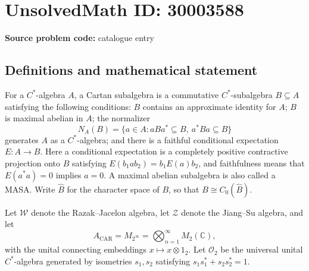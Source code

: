 \documentclass[11pt]{article}
\newcommand{\C}{\mathbb{C}}
\begin{document}
\section*{UnsolvedMath ID: 30003588}
\textbf{Source problem code:} catalogue entry
\subsection{Definitions and mathematical statement}
For a \(C^*\)-algebra \(A\), a Cartan subalgebra is a commutative \(C^*\)-subalgebra \(B\subseteq A\) satisfying the following conditions: \(B\) contains an approximate identity for \(A\); \(B\) is maximal abelian in \(A\); the normalizer
\[
N_A(B)=\{a\in A:aBa^*\subseteq B,\ a^*Ba\subseteq B\}
\]
generates \(A\) as a \(C^*\)-algebra; and there is a faithful conditional expectation \(E:A\to B\). Here a conditional expectation is a completely positive contractive projection onto \(B\) satisfying \(E(b_1ab_2)=b_1E(a)b_2\), and faithfulness means that \(E(a^*a)=0\) implies \(a=0\). A maximal abelian subalgebra is also called a MASA. Write \(\widehat B\) for the character space of \(B\), so that \(B\cong C_0(\widehat B)\).

Let \(\mathcal W\) denote the Razak--Jacelon algebra, let \(\mathcal Z\) denote the Jiang--Su algebra, and let
\[
A_{\mathrm{CAR}}=M_{2^\infty}=\bigotimes_{n=1}^{\infty}M_2(\C),
\]
with the unital connecting embeddings \(x\mapsto x\otimes 1_2\). Let \(\mathcal O_2\) be the universal unital \(C^*\)-algebra generated by isometries \(s_1,s_2\) satisfying \(s_1s_1^*+s_2s_2^*=1\).
\end{document}
